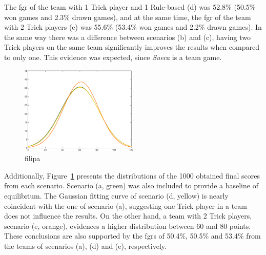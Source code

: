 The \ac{fgr} of the team with 1 Trick player and 1 Rule-based (d) was 52.8\% (50.5\% won games and 2.3\% drawn games), and at the same time, the \ac{fgr} of the team with 2 Trick players (e) was 55.6\% (53.4\% won games and 2.2\% drawn games).
In the same way there was a difference between scenarios (b) and (c), having two Trick players on the same team significantly improves the results when compared to only one.
This evidence was expected, since \emph{Sueca} is a team game.

\begin{figure}[h!]
  \centering
    \includegraphics[width=0.5\textwidth]{./img/4/ADE}
  \caption{filipa}
\label{fig:ADE}
\end{figure}

Additionally, Figure~\ref{fig:ADE} presents the distributions of the 1000 obtained final scores from each scenario.
Scenario (a, green) was also included to provide a baseline of equilibrium.
The Gaussian fitting curve of scenario (d, yellow) is nearly coincident with the one of scenario (a), suggesting one Trick player in a team does not influence the results.
On the other hand, a team with 2 Trick players, scenario (e, orange), evidences a higher distribution between 60 and 80 points.
These conclusions are also supported by the \acp{fgr} of 50.4\%, 50.5\% and 53.4\% from the teams of scenarios (a), (d) and (e), respectively.

